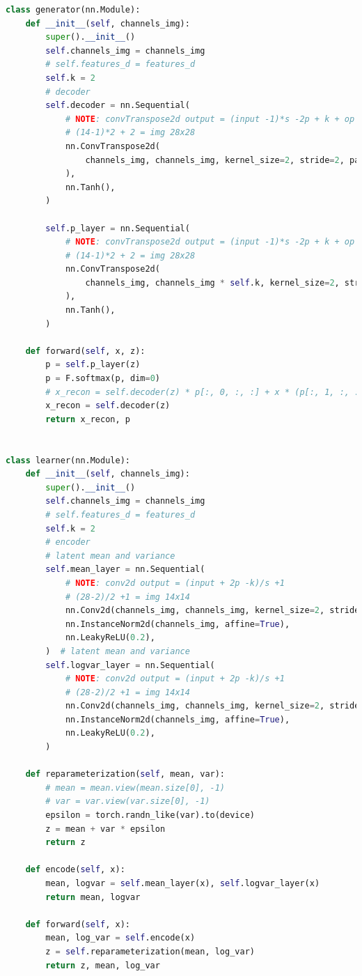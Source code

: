\documentclass[12pt]{article}
\begin{document}
\begin{lstlisting}[language=Python, caption= GAN and VAE model]
  class generator(nn.Module):
    def __init__(self, channels_img):
        super().__init__()
        self.channels_img = channels_img
        # self.features_d = features_d
        self.k = 2
        # decoder
        self.decoder = nn.Sequential(
            # NOTE: convTranspose2d output = (input -1)*s -2p + k + op
            # (14-1)*2 + 2 = img 28x28
            nn.ConvTranspose2d(
                channels_img, channels_img, kernel_size=2, stride=2, padding=0
            ),
            nn.Tanh(),
        )

        self.p_layer = nn.Sequential(
            # NOTE: convTranspose2d output = (input -1)*s -2p + k + op
            # (14-1)*2 + 2 = img 28x28
            nn.ConvTranspose2d(
                channels_img, channels_img * self.k, kernel_size=2, stride=2, padding=0
            ),
            nn.Tanh(),
        )

    def forward(self, x, z):
        p = self.p_layer(z)
        p = F.softmax(p, dim=0)
        # x_recon = self.decoder(z) * p[:, 0, :, :] + x * (p[:, 1, :, :])
        x_recon = self.decoder(z)
        return x_recon, p


class learner(nn.Module):
    def __init__(self, channels_img):
        super().__init__()
        self.channels_img = channels_img
        # self.features_d = features_d
        self.k = 2
        # encoder
        # latent mean and variance
        self.mean_layer = nn.Sequential(
            # NOTE: conv2d output = (input + 2p -k)/s +1
            # (28-2)/2 +1 = img 14x14
            nn.Conv2d(channels_img, channels_img, kernel_size=2, stride=2),
            nn.InstanceNorm2d(channels_img, affine=True),
            nn.LeakyReLU(0.2),
        )  # latent mean and variance
        self.logvar_layer = nn.Sequential(
            # NOTE: conv2d output = (input + 2p -k)/s +1
            # (28-2)/2 +1 = img 14x14
            nn.Conv2d(channels_img, channels_img, kernel_size=2, stride=2),
            nn.InstanceNorm2d(channels_img, affine=True),
            nn.LeakyReLU(0.2),
        )

    def reparameterization(self, mean, var):
        # mean = mean.view(mean.size[0], -1)
        # var = var.view(var.size[0], -1)
        epsilon = torch.randn_like(var).to(device)
        z = mean + var * epsilon
        return z

    def encode(self, x):
        mean, logvar = self.mean_layer(x), self.logvar_layer(x)
        return mean, logvar

    def forward(self, x):
        mean, log_var = self.encode(x)
        z = self.reparameterization(mean, log_var)
        return z, mean, log_var

\end{lstlisting}
\end{document}
